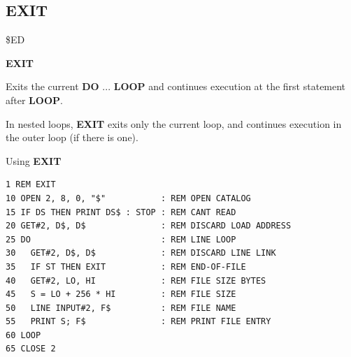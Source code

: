 \newpage
\subsection{EXIT}
\begin{description}[leftmargin=2cm,style=nextline]
\item [Token:]    \$ED

\item [Format:]   {\bf EXIT}

\item [Usage:]    Exits the current {\bf DO} ... {\bf LOOP} and continues execution at the first statement after {\bf LOOP}.

\item [Remarks:]  In nested loops, {\bf EXIT} exits only the current loop, and continues execution in the outer loop (if there is one).

\item [Example:]  Using {\bf EXIT}

\begin{tcolorbox}[colback=black,coltext=white]
\verbatimfont{\codefont}
\begin{verbatim}
1 REM EXIT
10 OPEN 2, 8, 0, "$"           : REM OPEN CATALOG
15 IF DS THEN PRINT DS$ : STOP : REM CANT READ
20 GET#2, D$, D$               : REM DISCARD LOAD ADDRESS
25 DO                          : REM LINE LOOP
30   GET#2, D$, D$             : REM DISCARD LINE LINK
35   IF ST THEN EXIT           : REM END-OF-FILE
40   GET#2, LO, HI             : REM FILE SIZE BYTES
45   S = LO + 256 * HI         : REM FILE SIZE
50   LINE INPUT#2, F$          : REM FILE NAME
55   PRINT S; F$               : REM PRINT FILE ENTRY
60 LOOP
65 CLOSE 2
\end{verbatim}
\end{tcolorbox}
\end{description}


\newpage
